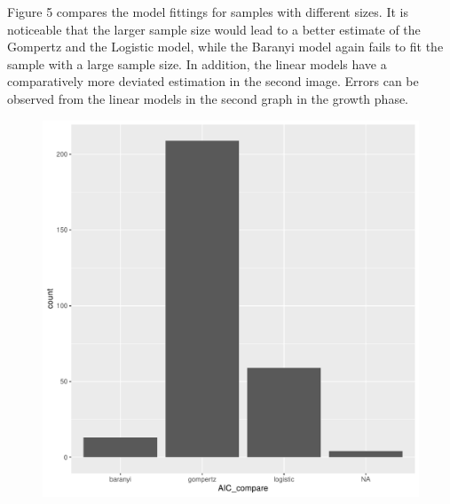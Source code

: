 \documentclass[11pt, oneside]{article}
\begin{document}
		\noindent Figure 5 compares the model fittings for samples with different sizes. It is noticeable that the larger sample size would lead to a better estimate of the Gompertz and the Logistic model, while the Baranyi model again fails to fit the sample with a large sample size. In addition, the linear models have a comparatively more deviated estimation in the second image. Errors can be observed from the linear models in the second graph in the growth phase.
		
		\begin{figure}[H]
			\begin{center}
			\begin{minipage}{.5\textwidth}
				\centering
				\includegraphics[scale = 0.4]{AIC_plot.pdf}
			\end{minipage}%
			\begin{minipage}{.5\textwidth}
				\centering

\end{minipage}
\end{center}
\end{figure}
\end{document}
